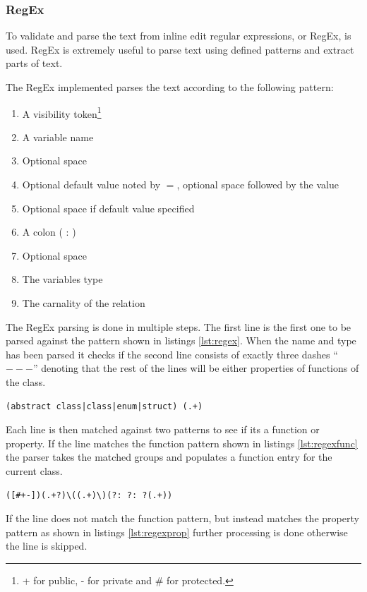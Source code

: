 \subsubsection{RegEx}
\label{sec:regex}
To validate and parse the text from inline edit regular expressions, or RegEx, is used. RegEx is extremely useful to parse text using defined patterns and extract parts of text.

The RegEx implemented parses the text according to the following pattern:
\begin{enumerate}
\item A visibility token\footnote{+ for public, - for private and \# for protected.}
\item A variable name
\item Optional space
\item Optional default value noted by $=$, optional space followed by the value
\item Optional space if default value specified
\item A colon ( : )
\item Optional space
\item The variables type
\item The carnality of the relation
\end{enumerate}

The RegEx parsing is done in multiple steps. The first line is the first one to be parsed against the pattern shown in listings \ref{lst:regex}. When the name and type has been parsed it checks if the second line consists of exactly three dashes ``$---$'' denoting that the rest of the lines will be either properties of functions of the class.

\begin{lstlisting}[caption={RegEx for class type and name matching},label=lst:regex]
(abstract class|class|enum|struct) (.+)
\end{lstlisting}

Each line is then matched against two patterns to see if its a function or property. If the line matches the function pattern shown in listings \ref{lst:regexfunc} the parser takes the matched groups and populates a function entry for the current class.

\begin{lstlisting}[caption={RegEx for function matching},label=lst:regexfunc]
([#+-])(.+?)\((.+)\)(?: ?: ?(.+))
\end{lstlisting}

If the line does not match the function pattern, but instead matches the property pattern as shown in listings \ref{lst:regexprop} further processing is done otherwise the line is skipped.

